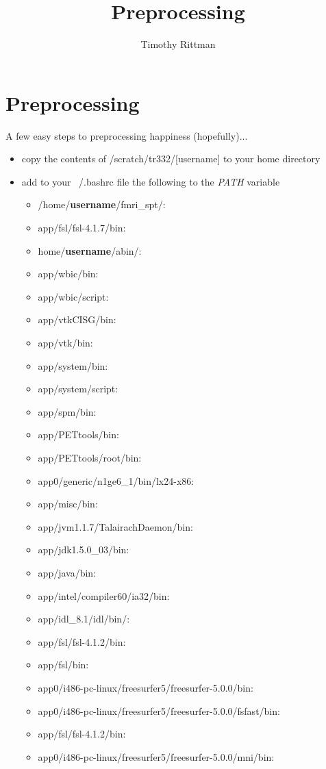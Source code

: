 \documentclass[a4paper,10pt]{article}
\title{Preprocessing}
\author{Timothy Rittman}
\begin{document}
\maketitle
\section{Preprocessing}
A few easy steps to preprocessing happiness (hopefully)...
\begin{itemize}
 \item copy the contents of /scratch/tr332/[username] to your home directory
 \item add to your ~/.bashrc file the following to the \emph{PATH} variable
 \begin{itemize}
   \item /home/\textbf{username}/fmri\_spt/:
   \item app/fsl/fsl-4.1.7/bin:
   \item home/\textbf{username}/abin/:
   \item app/wbic/bin:
   \item app/wbic/script:
   \item app/vtkCISG/bin:
   \item app/vtk/bin:
   \item app/system/bin:
   \item app/system/script:
   \item app/spm/bin:
   \item app/PETtools/bin:
   \item app/PETtools/root/bin:
   \item app0/generic/n1ge6\_1/bin/lx24-x86:
   \item app/misc/bin:
   \item app/jvm1.1.7/TalairachDaemon/bin:
   \item app/jdk1.5.0\_03/bin:
   \item app/java/bin:
   \item app/intel/compiler60/ia32/bin:
   \item app/idl\_8.1/idl/bin/:
   \item app/fsl/fsl-4.1.2/bin:
   \item app/fsl/bin:
   \item app0/i486-pc-linux/freesurfer5/freesurfer-5.0.0/bin:
   \item app0/i486-pc-linux/freesurfer5/freesurfer-5.0.0/fsfast/bin:
   \item app/fsl/fsl-4.1.2/bin:
   \item app0/i486-pc-linux/freesurfer5/freesurfer-5.0.0/mni/bin:

\end{itemize}
\end{itemize}
\end{document}
